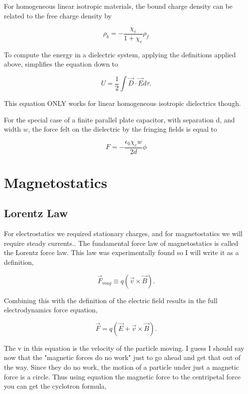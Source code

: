 \documentclass[preprint, review,12pt]{elsarticle}
\def\x{\times}
\def\.{\cdot}
\begin{document}
For homogeneous linear isotropic materials, the bound charge density can be related to the free charge density by

\begin{equation}
    \rho_b = - \frac{\chi_e}{1+\chi_e}\rho_f
\end{equation}

To compute the energy in a dielectric system, applying the definitions applied above, simplifies the equation down to

\begin{equation}
    U = \frac{1}{2}\int \vec{D}\. \vec{E}d\tau.
\end{equation}

This equation ONLY works for linear homogeneous isotropic dielectrics though.

For the special case of a finite parallel plate capacitor, with separation d, and width $w$, the force felt on the dielectric by the fringing fields is equal to 

\begin{equation}
    F = -\frac{\epsilon_0\chi_ew}{2d}\phi
\end{equation}

\section{Magnetostatics}

\subsection{Lorentz Law}

For electrostatics we required stationary charges, and for magnetostatics we will require steady currents.. The fundamental force law of magnetostatics is called the Lorentz force law. This law was experimentally found so I will write it as a definition,

\begin{equation}
    \vec{F}_{mag} \equiv q(\vec{v} \x \vec{B}).
\end{equation}

Combining this with the definition of the electric field results in the full electrodynamics force equation,

\begin{equation}
    \vec{F} = q(\vec{E} + \vec{v} \x \vec{B}).
\end{equation}

The v in this equation is the velocity of the particle moving. I guess I should say now that the "magnetic forces do no work" just to go ahead and get that out of the way. Since they do no work, the motion of a particle under just a magnetic force is a circle. Thus using equation the magnetic force to the centripetal force you can get the cyclotron formula,
\end{document}
